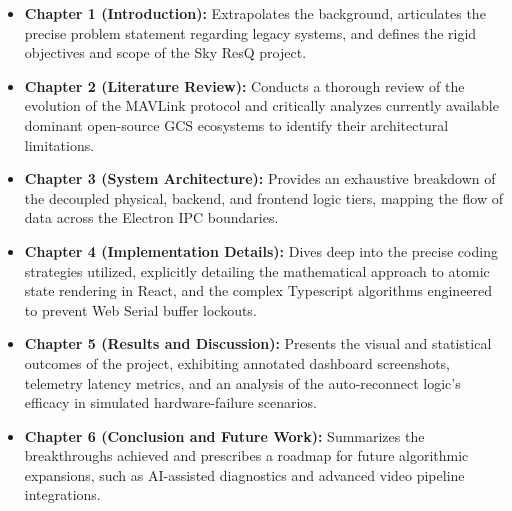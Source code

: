 \begin{itemize}
    \item \textbf{Chapter 1 (Introduction):} Extrapolates the background, articulates the precise problem statement regarding legacy systems, and defines the rigid objectives and scope of the Sky ResQ project.
    \item \textbf{Chapter 2 (Literature Review):} Conducts a thorough review of the evolution of the MAVLink protocol and critically analyzes currently available dominant open-source GCS ecosystems to identify their architectural limitations.
    \item \textbf{Chapter 3 (System Architecture):} Provides an exhaustive breakdown of the decoupled physical, backend, and frontend logic tiers, mapping the flow of data across the Electron IPC boundaries.
    \item \textbf{Chapter 4 (Implementation Details):} Dives deep into the precise coding strategies utilized, explicitly detailing the mathematical approach to atomic state rendering in React, and the complex Typescript algorithms engineered to prevent Web Serial buffer lockouts.
    \item \textbf{Chapter 5 (Results and Discussion):} Presents the visual and statistical outcomes of the project, exhibiting annotated dashboard screenshots, telemetry latency metrics, and an analysis of the auto-reconnect logic's efficacy in simulated hardware-failure scenarios.
    \item \textbf{Chapter 6 (Conclusion and Future Work):} Summarizes the breakthroughs achieved and prescribes a roadmap for future algorithmic expansions, such as AI-assisted diagnostics and advanced video pipeline integrations.
\end{itemize}
